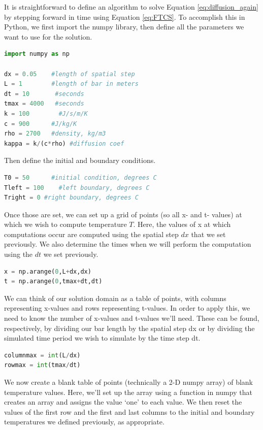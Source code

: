 It is straightforward to define an algorithm to solve Equation \ref{eq:diffusion_again} by stepping forward in time using Equation \ref{eq:FTCS}.
To accomplish this in Python, we first import the numpy library, then define all the parameters we want to use for the solution.

\begin{lstlisting}[language=Python]
import numpy as np

dx = 0.05    #length of spatial step
L = 1        #length of bar in meters
dt = 10       #seconds
tmax = 4000   #seconds
k = 100        #J/s/m/K
c = 900      #J/kg/K
rho = 2700   #density, kg/m3
kappa = k/(c*rho) #diffusion coef
\end{lstlisting}

Then define the initial and boundary conditions.

\begin{lstlisting}[language=Python]
T0 = 50      #initial condition, degrees C
Tleft = 100    #left boundary, degrees C
Tright = 0 #right boundary, degrees C
\end{lstlisting}

Once those are set, we can set up a grid of points (so all x- and t- values) at which we wish to compute temperature $T$.
Here, the values of x at which computations occur are computed using the spatial step $dx$ that we set previously.
We also determine the times when we will perform the computation using the $dt$ we set previously.

\begin{lstlisting}[language=Python]
x = np.arange(0,L+dx,dx)
t = np.arange(0,tmax+dt,dt)
\end{lstlisting}

We can think of our solution domain as a table of points, with columns representing x-values and rows representing t-values. In order to apply this, we need to know the number of x-values and t-values we'll need.
These can be found, respectively, by dividing our bar length by the spatial step dx or by dividing the simulated time period we wish to simulate by the time step dt.

\begin{lstlisting}[language=Python]
columnmax = int(L/dx)
rowmax = int(tmax/dt)
\end{lstlisting}

We now create a blank table of points (technically a 2-D numpy array) of blank temperature values.
Here, we'll set up the array using a function in numpy that creates an array and assigns the value `one' to each value.
We then reset the values of the first row and the first and last columns to the initial and boundary temperatures we defined previously, as appropriate.

